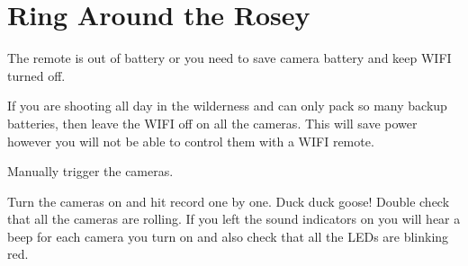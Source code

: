\chapter{Ring Around the Rosey}
\pagecolor{white}
\label{chap:21}
\begin{fullwidth}


\problem

{\large The remote is out of battery or you need to save camera battery and keep WIFI turned off. \par}

If you are shooting all day in the wilderness and can only pack so many backup batteries, then leave the WIFI off on all the cameras. This will save power however you will not be able to control them with a WIFI remote. 


\solution

{\large Manually trigger the cameras. \par}

Turn the cameras on and hit record one by one. Duck duck goose! Double check that all the cameras are rolling. If you left the sound indicators on you will hear a beep for each camera you turn on and also check that all the LEDs are blinking red. 


\clearpage
\end{fullwidth}
